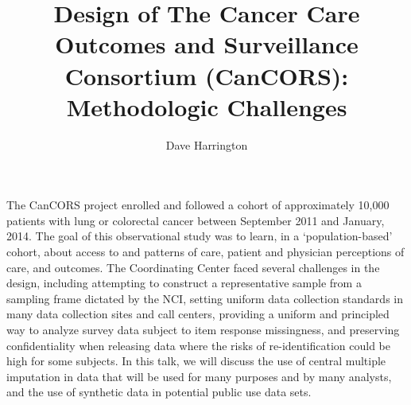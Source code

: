 \documentclass[12pt]{amsart}
\title{Design of The Cancer Care Outcomes and Surveillance Consortium (CanCORS): Methodologic Challenges}
\author{Dave Harrington}
\begin{document}
\maketitle

The CanCORS project enrolled and followed a cohort of approximately 10,000 patients with lung or colorectal cancer between September 2011 and January, 2014.  The goal of this observational study was to learn, in a `population-based' cohort, about access to and patterns of care, patient and physician perceptions of care, and outcomes.  The Coordinating Center faced several challenges in the design, including attempting to construct a representative sample from a sampling frame dictated by the NCI, setting uniform data collection standards in many data collection sites and call centers, providing a uniform and principled way to analyze survey data subject to item response missingness, and preserving confidentiality when releasing data where the risks of re-identification could be high for some subjects.  In this talk, we will discuss the use of central multiple imputation in data that will be used for many purposes and by many analysts, and the use of synthetic data in potential public use data sets.
\end{document}
